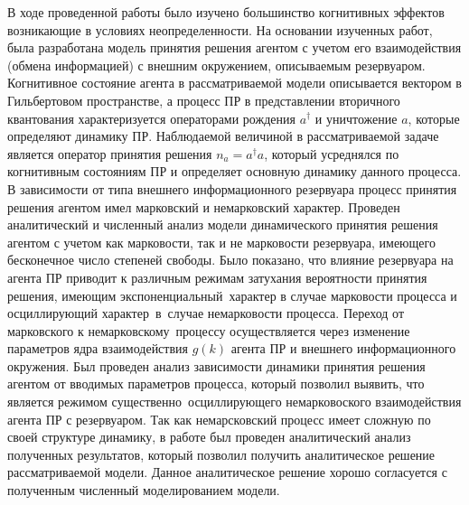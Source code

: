 \conclusion

В ходе проведенной работы было изучено большинство когнитивных эффектов возникающие в условиях неопределенности.
На основании изученных работ, была разработана модель принятия решения агентом с учетом его взаимодействия
(обмена информацией) с внешним окружением, описываемым резервуаром.
Когнитивное состояние агента в рассматриваемой модели описывается вектором в Гильбертовом пространстве,
а процесс ПР в представлении вторичного квантования характеризуется операторами рождения $a^{\dagger}$
и уничтожение $a$, которые определяют динамику ПР.
Наблюдаемой величиной в рассматриваемой задаче является оператор принятия решения $n_{a} = a^{\dagger} a$,
который усреднялся по когнитивным состояниям ПР и определяет основную динамику данного процесса.
В зависимости от типа внешнего информационного резервуара процесс принятия решения агентом имел марковский
и немарковский характер.
Проведен аналитический и численный анализ модели динамического принятия решения агентом с учетом как
марковости, так и не марковости резервуара, имеющего бесконечное число степеней свободы.
Было показано, что влияние резервуара на агента ПР приводит к различным режимам затухания вероятности
принятия решения, имеющим экспоненциальный~характер в случае марковости процесса и осциллирующий
характер~в~случае немарковости процесса.
Переход от марковского к немарковскому~процессу осуществляется через изменение параметров ядра
взаимодействия $g(k)$ агента ПР и внешнего информационного окружения.
Был проведен анализ зависимости динамики принятия решения агентом от вводимых параметров процесса,
который позволил выявить, что является режимом существенно~осциллирующего немарковоского взаимодействия
агента ПР с резервуаром.
Так как немарсковский процесс имеет сложную по своей структуре динамику, в работе был проведен аналитический
анализ полученных результатов, который позволил получить аналитическое решение рассматриваемой модели.
Данное аналитическое решение хорошо согласуется с полученным численный моделированием модели.